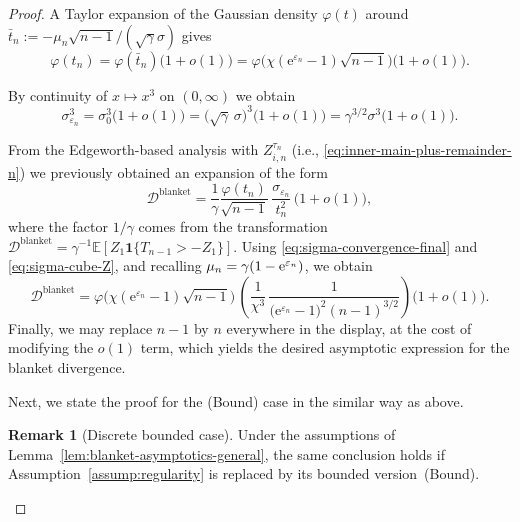 \documentclass{article}
\theoremstyle{plain}
\theoremstyle{definition}
\newtheorem{corollary}[theorem]{Remark}
\begin{document}
\begin{proof}
A Taylor expansion of the Gaussian density $\varphi(t)$ around $\bar t_n := -\mu_n\sqrt{n-1}/(\sqrt{\gamma}\sigma)$ gives
\[
  \varphi(t_n)
  = \varphi(\bar t_n)\bigl(1 + o(1)\bigr)
  = \varphi\bigl(\chi(\mathrm e^{\varepsilon_n}-1)\sqrt{n-1}\bigr)\bigl(1+o(1)\bigr).
\]


\medskip


By continuity of $x\mapsto x^3$ on
$(0,\infty)$ we obtain
\begin{equation}
  \label{eq:sigma-cube-Z}
  \sigma_{\varepsilon_n}^3
  = \sigma_0^3\bigl(1+o(1)\bigr)
  = \bigl(\sqrt{\gamma}\,\sigma\bigr)^3\bigl(1+o(1)\bigr)
  = \gamma^{3/2}\sigma^3\bigl(1+o(1)\bigr).
\end{equation}

\medskip


From the Edgeworth-based analysis with $Z_{i,n}^{\tau_n}$ (i.e., \eqref{eq:inner-main-plus-remainder-n}) we previously
obtained an expansion of the form
\[
  \mathcal D^{\mathrm{blanket}}
  = \frac{1}{\gamma}\frac{\varphi(t_n)}{\sqrt{n-1}}\,
    \frac{\sigma_{\varepsilon_n}}{t_n^2}\,
    \bigl(1+o(1)\bigr),
\]
where the factor $1/\gamma$ comes from the transformation
$\mathcal D^{\mathrm{blanket}}
 = \gamma^{-1}\mathbb E[Z_1\mathbf 1\{T_{n-1}>-Z_1\}]$.
Using \eqref{eq:sigma-convergence-final} and \eqref{eq:sigma-cube-Z}, and recalling
$\mu_n = \gamma(1-{\rm e}^{\varepsilon_n})$, we obtain
\[
  \mathcal D^{\mathrm{blanket}}
  =
  \varphi\bigl(\chi(\mathrm e^{\varepsilon_n}-1)\sqrt{n-1}\bigr)\,
  \left(
    \frac{1}{\chi^3}\,
    \frac{1}{\bigl(\mathrm e^{\varepsilon_n}-1\bigr)^2 (n-1)^{3/2}}
  \right)\bigl(1+o(1)\bigr).
\]
Finally, we may replace $n-1$ by $n$ everywhere in the display, at the
cost of modifying the $o(1)$ term, which yields the desired asymptotic
expression for the blanket divergence.


\qedhere


Next, we state the proof for the (Bound) case in the similar way as above.


\begin{corollary}[Discrete bounded case]
\label{cor:blanket-asymptotics-discrete-Disc}
Under the assumptions of Lemma~\ref{lem:blanket-asymptotics-general},
the same conclusion holds if Assumption~\ref{assump:regularity} is
replaced by its bounded version~\textup{(Bound)}.
\end{corollary}



\end{proof}
\end{document}
